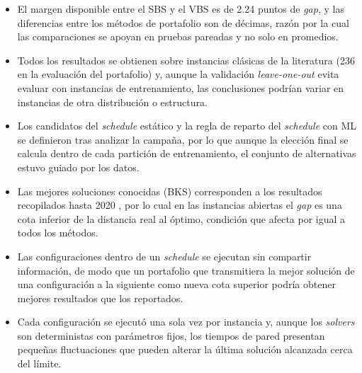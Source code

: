 \begin{itemize}
  \item El margen disponible entre el SBS y el VBS es de 2.24 puntos de
    \textit{gap}, y las diferencias entre los métodos de portafolio son de
    décimas, razón por la cual las comparaciones se apoyan en pruebas pareadas
    y no solo en promedios.
  \item Todos los resultados se obtienen sobre instancias clásicas de la
    literatura (236 en la evaluación del portafolio) y, aunque la validación \textit{leave-one-out} evita evaluar
    con instancias de entrenamiento, las conclusiones podrían variar en
    instancias de otra distribución o estructura.
  \item Los candidatos del \textit{schedule} estático y la regla de reparto del
    \textit{schedule} con ML se definieron tras analizar la campaña, por lo que
    aunque la elección final se calcula dentro de cada partición de
    entrenamiento, el conjunto de alternativas estuvo guiado por los datos.
  \item Las mejores soluciones conocidas (BKS) corresponden a los resultados
    recopilados hasta 2020 \citep{weise2019jssp}, por lo cual en las instancias
    abiertas el \textit{gap} es una cota inferior de la distancia real al
    óptimo, condición que afecta por igual a todos los métodos.
  \item Las configuraciones dentro de un \textit{schedule} se ejecutan sin
    compartir información, de modo que un portafolio que transmitiera la mejor
    solución de una configuración a la siguiente como nueva cota superior
    podría obtener mejores resultados que los reportados.
  \item Cada configuración se ejecutó una sola vez por instancia y, aunque los
    \textit{solvers} son deterministas con parámetros fijos, los tiempos de
    pared presentan pequeñas fluctuaciones que pueden alterar la última
    solución alcanzada cerca del límite.
\end{itemize}
